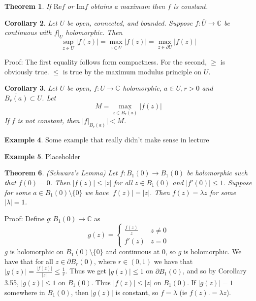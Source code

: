 \documentclass[11pt]{article}
\theoremstyle{plain}
\newtheorem{theorem}{Theorem}[section]
\newtheorem{corollary}[theorem]{Corollary}
\theoremstyle{definition}
\newtheorem{example}[theorem]{Example}
\newcommand{\re}[0]{\text{Re}}
\newcommand{\im}[0]{\text{Im}}
\newcommand{\C}{\mathbb{C}}
\begin{document}
\begin{theorem}
If $\re f$ or $\im f$ obtains a maximum then $f$ is constant. 
\end{theorem}

\begin{corollary} 
Let $U$ be open, connected, and bounded. Suppose $f: \overline{U} \to \C$ be continuous with $f|_U$ holomorphic. Then 
$$ \sup_{z\in U} |f(z)| = \max_{z \in \overline{U}} |f(z)| = \max_{z\in\partial U} |f(z)| $$
\end{corollary}

Proof: The first equality follows form compactness. For the second, $\geq$ is obviously true. $\leq$ is true by the maximum modulus principle on $U$.

\begin{corollary} 
Let $U$ be open, $f: U \to \C$ holomorphic, $a \in U, r > 0$ and $\overline{B_r(a)} \subset U$. Let 
$$M = \max_{z \in \overline{B_r(a)}} |f(z)|$$
If $f$ is not constant, then $|f|_{B_r(a)}| < M$. 
\end{corollary}


\begin{example}
Some example that really didn't make sense in lecture
\end{example}

\begin{example}
Placeholder
\end{example}

\begin{theorem}
(Schwarz's Lemma) Let $f:B_1(0) \to B_1(0)$ be holomorphic such that $f(0) = 0$. Then $|f(z)| \leq |z|$ for all $z \in B_1(0)$ and $|f'(0)| \leq 1$. Suppose for some $a \in B_1(0) \setminus \{ 0 \}$ we have $|f(z)| = |z|$. Then $f(z) = \lambda z$ for some $|\lambda| = 1$. 
\end{theorem}

Proof: Define $g:B_1(0) \to \C$ as 
$$ g(z) = \begin{cases} \frac{f(z)}{z} & z \neq 0 \\ f'(z) & z = 0 \end{cases}$$
$g$ is holomorphic on $B_1(0) \setminus \{ 0 \}$ and continuous at $0$, so $g$ is holomorphic. We have that for all $z \in \partial B_r(0)$, where $r \in (0, 1)$ we have that $|g(z)| = \frac{|f(z)|}{|z|} \leq \frac{1}{r}$. Thus we get $|g(z)| \leq 1$ on $\partial B_1(0)$, and so by Corollary 3.55, $|g(z)| \leq 1$ on $B_1(0)$. Thus $|f(z)| \leq |z|$ on $B_1(0)$. If $|g(z)| = 1$ somewhere in $B_1(0)$, then $|g(z)|$ is constant, so $f = \lambda$ (ie $f(z).= \lambda z$).
\end{document}
